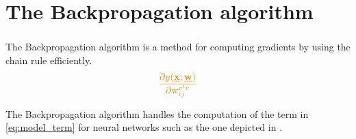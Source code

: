 \section{The Backpropagation algorithm}


\begin{frame}\frametitle{\secname}

The Backpropagation algorithm is a method for computing gradients by using the chain rule efficiently.
\begin{equation}
	\textcolor{orange}{	\frac{\partial y(\vec{x}; \vec{w})}{
			\partial \mathrm{w}_{ij}^{v'v}}}
    \label{eq:model_term}
\end{equation}
    
The Backpropagation algorithm handles the computation of the term in \eqref{eq:model_term} for neural networks such as the one depicted in .

\end{frame}

